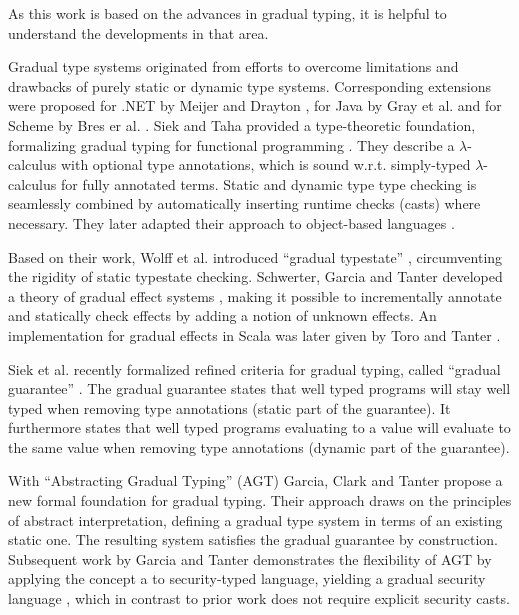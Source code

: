 As this work is based on the advances in gradual typing, it is helpful to understand the developments in that area.

Gradual type systems originated from efforts to overcome limitations and drawbacks of purely static or dynamic type systems.
Corresponding extensions were proposed for .NET by Meijer and Drayton \cite{meijer2004static}, for Java by Gray et al. \cite{gray2005fine} and for Scheme by Bres er al. \cite{bres2004compiling}.
Siek and Taha provided a type-theoretic foundation, formalizing gradual typing for functional programming \cite{siek2006gradual}.
They describe a $\lambda$-calculus with optional type annotations, which is sound w.r.t. simply-typed $\lambda$-calculus for fully annotated terms.
Static and dynamic type type checking is seamlessly combined by automatically inserting runtime checks (casts) where necessary.
They later adapted their approach to object-based languages \cite{siek2007gradual}.

Based on their work, Wolff et al. introduced “gradual typestate” \cite{wolff2011gradual}, circumventing the rigidity of static typestate checking.
Schwerter, Garcia and Tanter developed a theory of gradual effect systems \cite{banados2014theory}, making it possible to incrementally annotate and statically check effects by adding a notion of unknown effects.
An implementation for gradual effects in Scala was later given by Toro and Tanter \cite{toro2015customizable}.

\label{grad-guarantee}
Siek et al. recently formalized refined criteria for gradual typing, called “gradual guarantee” \cite{siek2015refined}.
The gradual guarantee states that well typed programs will stay well typed when removing type annotations (static part of the guarantee).
It furthermore states that well typed programs evaluating to a value will evaluate to the same value when removing type annotations (dynamic part of the guarantee).

With “Abstracting Gradual Typing” (AGT) \cite{garcia2016abstracting} Garcia, Clark and Tanter propose a new formal foundation for gradual typing.
Their approach draws on the principles of abstract interpretation, defining a gradual type system in terms of an existing static one.
The resulting system satisfies the gradual guarantee by construction.
Subsequent work by Garcia and Tanter demonstrates the flexibility of AGT by applying the concept a to security-typed language, yielding a gradual security language \cite{garcia2015deriving}, which in contrast to prior work does not require explicit security casts.
